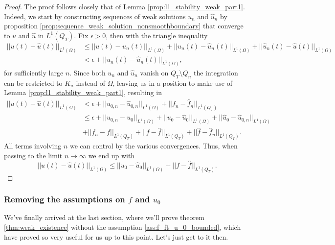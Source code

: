 \documentclass[11pt, a4paper]{article}
\begin{document}
\begin{proof}
The proof follows closely that of Lemma \ref{prop:l1_stability_weak_part1}. Indeed, we start by constructing sequences of weak solutions $u_n$ and $\hat{u}_n$ by proposition \ref{prop:sequence_weak_solution_nonsmoothboundary} that converge to $u$ and $\hat{u}$ in $L^1(Q_T)$. Fix $\epsilon > 0$, then with the triangle inequality
\begin{align*}
||u(t) - \hat{u}(t)||_{L^1(\Omega)} &\leq ||u(t) - u_n(t)||_{L^1(\Omega)} + ||u_n(t) - \hat{u}_n(t)||_{L^1(\Omega)} + ||\hat{u}_n(t) - \hat{u}(t)||_{L^1(\Omega)} \\
&< \epsilon + ||u_n(t) - \hat{u}_n(t)||_{L^1(\Omega)},
\end{align*}
for sufficiently large $n$. Since both $u_n$ and $\hat{u}_n$ vanish on $Q_T\setminus Q_n$ the integration can be restricted to $K_n$ instead of $\Omega$, leaving us in a position to make use of Lemma \ref{prop:l1_stability_weak_part1}, resulting in
\begin{align*}
||u(t) - \hat{u}(t)||_{L^1(\Omega)} &< \epsilon + ||u_{0,n} - \hat{u}_{0,n}||_{L^1(\Omega)} + ||f_n - \hat{f}_n||_{L^1(Q_T)} \\
&\leq \epsilon + ||u_{0,n} - u_0||_{L^1(\Omega)} + ||u_0 - \hat{u}_0||_{L^1(\Omega)} + ||\hat{u}_0 - \hat{u}_{0,n}||_{L^1(\Omega)} \\
&+ ||f_n - f||_{L^1(Q_T)} + ||f - \hat{f}||_{L^1(Q_T)} + ||\hat{f} - \hat{f}_n||_{L^1(Q_T)}.
\end{align*}
All terms involving $n$ we can control by the various convergences. Thus, when passing to the limit $n \to \infty$ we end up with
\begin{equation}
||u(t) - \hat{u}(t)||_{L^1(\Omega)} \leq ||u_0 - \hat{u}_0||_{L^1(\Omega)} + ||f - \hat{f}||_{L^1(Q_T)}.
\end{equation}

\end{proof}


\subsubsection{Removing the assumptions on $f$ and $u_0$}
We've finally arrived at the last section, where we'll prove theorem \ref{thm:weak_existence} without the assumption \ref{ass:f_ft_u_0_bounded}, which have proved so very useful for us up to this point. Let's just get to it then.
\end{document}
